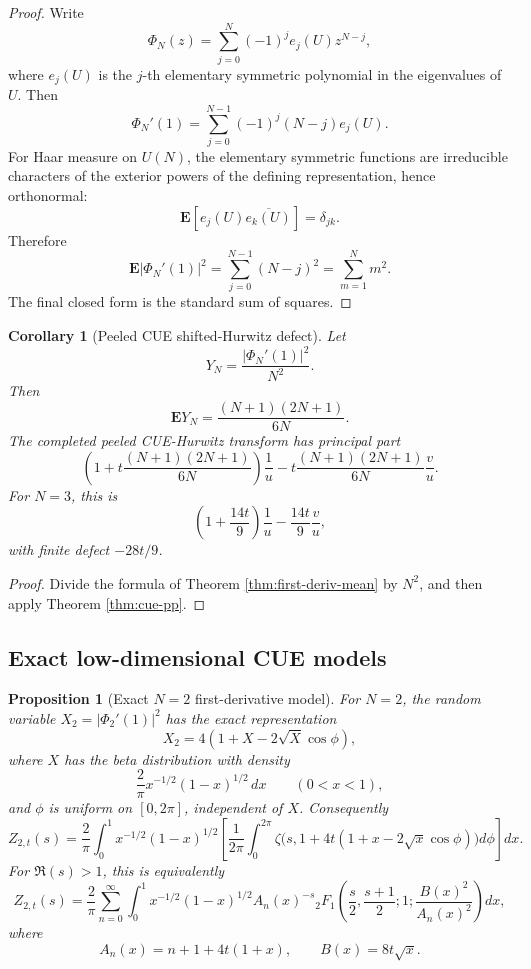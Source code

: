\documentclass[11pt]{article}
\theoremstyle{plain}
\newtheorem{proposition}[theorem]{Proposition}
\newtheorem{corollary}[theorem]{Corollary}
\theoremstyle{definition}
\begin{document}
\begin{proof}
Write
\[
   \Phi_N(z)=\sum_{j=0}^N(-1)^j e_j(U)z^{N-j},
\]
where \(e_j(U)\) is the \(j\)-th elementary symmetric polynomial in the eigenvalues of \(U\).  Then
\[
   \Phi_N'(1)=\sum_{j=0}^{N-1}(-1)^j(N-j)e_j(U).
\]
For Haar measure on \(U(N)\), the elementary symmetric functions are irreducible characters of the exterior powers of the defining representation, hence orthonormal:
\[
   \mathbf E[e_j(U)\overline{e_k(U)}]=\delta_{jk}.
\]
Therefore
\[
   \mathbf E|\Phi_N'(1)|^2=\sum_{j=0}^{N-1}(N-j)^2=\sum_{m=1}^Nm^2.
\]
The final closed form is the standard sum of squares.
\end{proof}

\begin{corollary}[Peeled CUE shifted-Hurwitz defect]\label{cor:cue-peeled-defect}
Let
\[
   Y_N=\frac{|\Phi_N'(1)|^2}{N^2}.
\]
Then
\[
   \mathbf E Y_N=\frac{(N+1)(2N+1)}{6N}.
\]
The completed peeled CUE-Hurwitz transform has principal part
\[
   \left(1+t\frac{(N+1)(2N+1)}{6N}\right)\frac1u
   -t\frac{(N+1)(2N+1)}{6N}\frac vu.
\]
For \(N=3\), this is
\[
   \left(1+\frac{14t}{9}\right)\frac1u-\frac{14t}{9}\frac vu,
\]
with finite defect \(-28t/9\).
\end{corollary}


\begin{proof}
Divide the formula of Theorem \ref{thm:first-deriv-mean} by \(N^2\), and then apply Theorem \ref{thm:cue-pp}.
\end{proof}

\subsection{Exact low-dimensional CUE models}

\begin{proposition}[Exact \(N=2\) first-derivative model]\label{prop:N2-exact-model}
For \(N=2\), the random variable \(X_2=|\Phi_2'(1)|^2\) has the exact representation
\[
   X_2=4(1+X-2\sqrt X\cos\phi),
\]
where \(X\) has the beta distribution with density
\[
   \frac2\pi x^{-1/2}(1-x)^{1/2}\,dx\qquad(0<x<1),
\]
and \(\phi\) is uniform on \([0,2\pi]\), independent of \(X\).  Consequently
\[
 Z_{2,t}(s)=\frac2\pi\int_0^1x^{-1/2}(1-x)^{1/2}
 \left[\frac1{2\pi}\int_0^{2\pi}\zeta\!\bigl(s,1+4t(1+x-2\sqrt x\cos\phi)\bigr)d\phi\right]dx.
\]
For \(\Re(s)>1\), this is equivalently
\[
 Z_{2,t}(s)=\frac2\pi\sum_{n=0}^{\infty}\int_0^1 x^{-1/2}(1-x)^{1/2}A_n(x)^{-s}
 {}_2F_1\left(\frac s2,\frac{s+1}{2};1;\frac{B(x)^2}{A_n(x)^2}\right)dx,
\]
where
\[
   A_n(x)=n+1+4t(1+x),\qquad B(x)=8t\sqrt x.
\]
\end{proposition}
\end{document}
